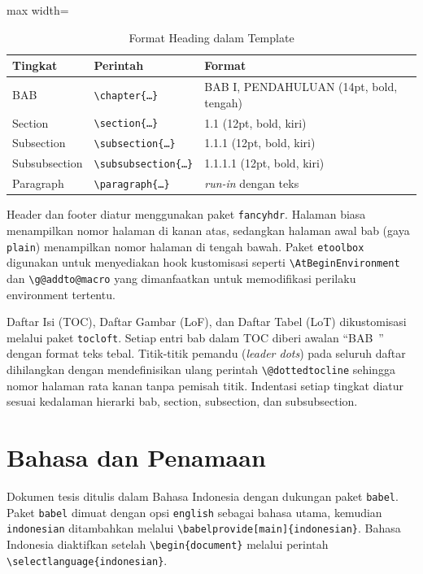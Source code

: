 \begin{table}[h]
  \centering
  \caption{Format Heading dalam Template}
  \label{tab:heading-format}
  \begin{adjustbox}{max width=\textwidth}
  \begin{tabular}{lll}
    \toprule
    \textbf{Tingkat} & \textbf{Perintah} & \textbf{Format} \\
    \midrule
    BAB & \texttt{\textbackslash chapter\{\dots\}} & BAB I, PENDAHULUAN (14pt, bold, tengah) \\
    Section & \texttt{\textbackslash section\{\dots\}} & 1.1 (12pt, bold, kiri) \\
    Subsection & \texttt{\textbackslash subsection\{\dots\}} & 1.1.1 (12pt, bold, kiri) \\
    Subsubsection & \texttt{\textbackslash subsubsection\{\dots\}} & 1.1.1.1 (12pt, bold, kiri) \\
    Paragraph & \texttt{\textbackslash paragraph\{\dots\}} & \textit{run-in} dengan teks \\
    \bottomrule
  \end{tabular}
  \end{adjustbox}
\end{table}

Header dan footer diatur menggunakan paket \texttt{fancyhdr}. Halaman biasa menampilkan nomor halaman di kanan atas, sedangkan halaman awal bab (gaya \texttt{plain}) menampilkan nomor halaman di tengah bawah. Paket \texttt{etoolbox} digunakan untuk menyediakan hook kustomisasi seperti \texttt{\textbackslash AtBeginEnvironment} dan \texttt{\textbackslash g@addto@macro} yang dimanfaatkan untuk memodifikasi perilaku environment tertentu.

Daftar Isi (TOC), Daftar Gambar (LoF), dan Daftar Tabel (LoT) dikustomisasi melalui paket \texttt{tocloft}. Setiap entri bab dalam TOC diberi awalan ``BAB~'' dengan format teks tebal. Titik-titik pemandu (\textit{leader dots}) pada seluruh daftar dihilangkan dengan mendefinisikan ulang perintah \texttt{\textbackslash @dottedtocline} sehingga nomor halaman rata kanan tanpa pemisah titik. Indentasi setiap tingkat diatur sesuai kedalaman hierarki bab, section, subsection, dan subsubsection.

\section{Bahasa dan Penamaan}

Dokumen tesis ditulis dalam Bahasa Indonesia dengan dukungan paket \texttt{babel}. Paket \texttt{babel} dimuat dengan opsi \texttt{english} sebagai bahasa utama, kemudian \texttt{indonesian} ditambahkan melalui \texttt{\textbackslash babelprovide[main]\{indonesian\}}. Bahasa Indonesia diaktifkan setelah \texttt{\textbackslash begin\{document\}} melalui perintah \texttt{\textbackslash selectlanguage\{indonesian\}}.

